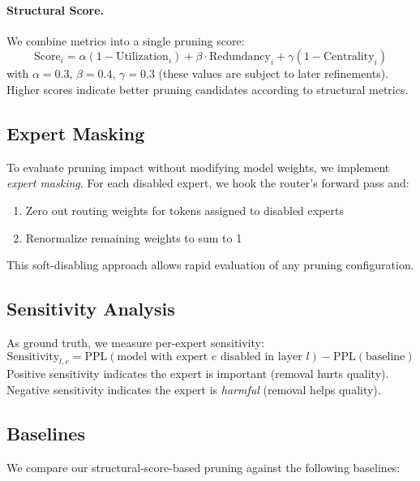 \documentclass{article}
\begin{document}
\paragraph{Structural Score.}
We combine metrics into a single pruning score:
\begin{equation}
    \text{Score}_i = \alpha (1 - \text{Utilization}_i) + \beta \cdot \text{Redundancy}_i + \gamma (1 - \text{Centrality}_i)
\end{equation}
with $\alpha=0.3$, $\beta=0.4$, $\gamma=0.3$ (these values are subject to later refinements).
Higher scores indicate better pruning candidates according to structural metrics.

\subsection{Expert Masking}

To evaluate pruning impact without modifying model weights, we implement \emph{expert masking}.
For each disabled expert, we hook the router's forward pass and:
\begin{enumerate}
    \item Zero out routing weights for tokens assigned to disabled experts
    \item Renormalize remaining weights to sum to 1
\end{enumerate}
This soft-disabling approach allows rapid evaluation of any pruning configuration.

\subsection{Sensitivity Analysis}

As ground truth, we measure per-expert sensitivity:
\begin{equation}
    \text{Sensitivity}_{l,e} = \text{PPL}(\text{model with expert } e \text{ disabled in layer } l) - \text{PPL}(\text{baseline})
\end{equation}
Positive sensitivity indicates the expert is important (removal hurts quality).
Negative sensitivity indicates the expert is \emph{harmful} (removal helps quality).

\subsection{Baselines}

We compare our structural-score-based pruning against the following baselines:
\end{document}

